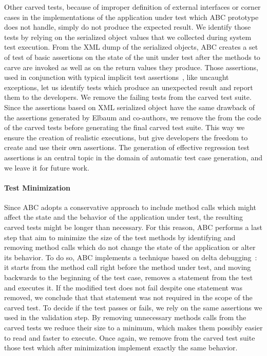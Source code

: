 \documentclass[10pt,conference]{IEEEtran}
\newcommand{\abc}{\textsf{ABC}\xspace}
\begin{document}
Other carved tests, because of improper definition of external interfaces or corner cases in the implementations of the application under test which \abc prototype does not handle, simply do not produce the expected result. 
We identify those tests by relying on the serialized object values that we collected during system test execution. From the XML dump of the serialized objects, \abc creates a set of test of basic assertions on the state of the unit under test after the methods to carve are invoked as well as on the return values they produce.
Those assertions, used in conjunction with typical implicit test assertions~\cite{randoop}, like uncaught exceptions, let us identify
 tests which produce an unexpected result and report them to the developers. We remove the failing tests from the carved test suite.
Since the assertions based on XML serialized object have the same drawback of the assertions generated by Elbaum and co-authors,
we remove the from the code of the carved tests before generating the final carved test suite. This way we ensure the creation of realistic executions, but give developers the freedom to create and use their own assertions. The generation of effective regression test assertions is an central topic in the domain of automatic test case generation, and we leave it for future work.

\paragraph{Test Minimization}
Since \abc adopts a conservative approach to include method calls which might affect the state and the behavior of the application under test, the resulting carved tests might be longer than necessary. 
For this reason, \abc performs a last step that aim to minimize the size of the test methods by identifying and removing method calls which do not change the state of the application or alter its behavior.
To do so, \abc implements a technique based on delta debugging~\cite{delta-debugging}: it starts from the method call right before the method under test, and moving backwards to the beginning of the test case, removes a statement from the test and executes it.
If the modified test does not fail despite one statement was removed, we conclude that that statement was not required in the scope of the carved test. To decide if the test passes or fails, we rely on the same assertions we used in the validation step.
By removing unnecessary methods calls from the carved tests we reduce their size to a minimum, which makes them possibly easier to read and faster to execute. 
%
Once again, we remove from the carved test suite those test  which after minimization implement exactly the same behavior.
\end{document}
